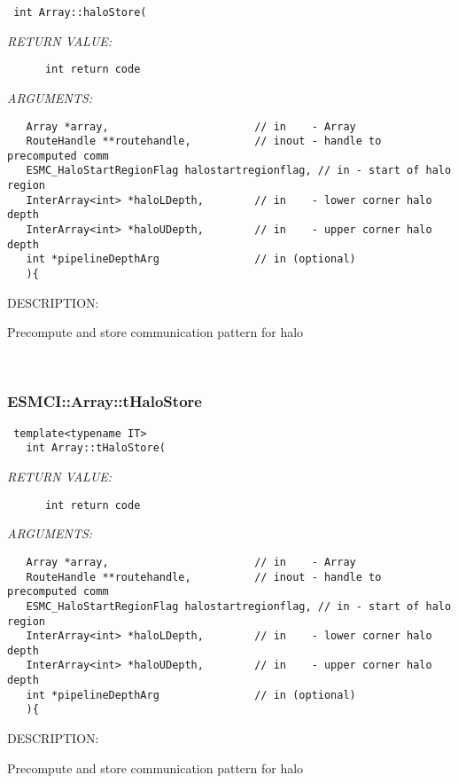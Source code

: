   
\begin{verbatim} int Array::haloStore(\end{verbatim}{\em RETURN VALUE:}
\begin{verbatim}      int return code\end{verbatim}{\em ARGUMENTS:}
\begin{verbatim}   Array *array,                       // in    - Array
   RouteHandle **routehandle,          // inout - handle to precomputed comm
   ESMC_HaloStartRegionFlag halostartregionflag, // in - start of halo region
   InterArray<int> *haloLDepth,        // in    - lower corner halo depth
   InterArray<int> *haloUDepth,        // in    - upper corner halo depth
   int *pipelineDepthArg               // in (optional)
   ){\end{verbatim}
{\sf DESCRIPTION:\\ }


    Precompute and store communication pattern for halo
   
 
\mbox{}\hrulefill\
 
\subsubsection [ESMCI::Array::tHaloStore] {ESMCI::Array::tHaloStore}


  
\begin{verbatim} template<typename IT>
   int Array::tHaloStore(\end{verbatim}{\em RETURN VALUE:}
\begin{verbatim}      int return code\end{verbatim}{\em ARGUMENTS:}
\begin{verbatim}   Array *array,                       // in    - Array
   RouteHandle **routehandle,          // inout - handle to precomputed comm
   ESMC_HaloStartRegionFlag halostartregionflag, // in - start of halo region
   InterArray<int> *haloLDepth,        // in    - lower corner halo depth
   InterArray<int> *haloUDepth,        // in    - upper corner halo depth
   int *pipelineDepthArg               // in (optional)
   ){\end{verbatim}
{\sf DESCRIPTION:\\ }


    Precompute and store communication pattern for halo
   
